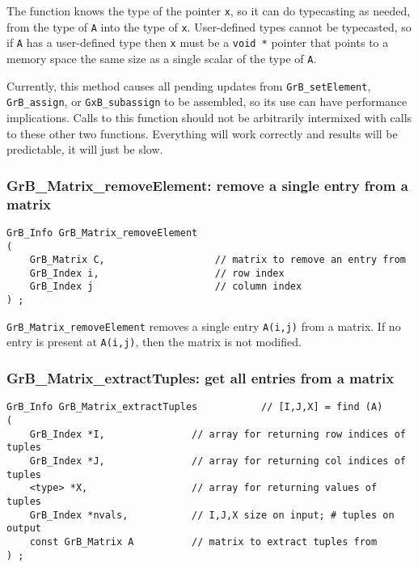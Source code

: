 \documentclass[12pt]{article}
\begin{document}
The function knows the type of the pointer \verb'x', so it can do typecasting
as needed, from the type of \verb'A' into the type of \verb'x'.  User-defined
types cannot be typecasted, so if \verb'A' has a user-defined type then
\verb'x' must be a \verb'void *' pointer that points to a memory space the same
size as a single scalar of the type of \verb'A'.

Currently, this method causes all pending updates from
\verb'GrB_setElement', \verb'GrB_assign', or \verb'GxB_subassign' to be
assembled, so its use can have performance implications.  Calls to this
function should not be arbitrarily intermixed with calls to these other two
functions.  Everything will work correctly and results will be predictable, it
will just be slow.

\subsubsection{{\sf GrB\_Matrix\_removeElement:} remove a single entry from a matrix}
\label{matrix_removeElement}

\begin{mdframed}[userdefinedwidth=6in]
{\footnotesize
\begin{verbatim}
GrB_Info GrB_Matrix_removeElement
(
    GrB_Matrix C,                   // matrix to remove an entry from
    GrB_Index i,                    // row index
    GrB_Index j                     // column index
) ;
\end{verbatim} } \end{mdframed}

\verb'GrB_Matrix_removeElement' removes a single entry \verb'A(i,j)' from a matrix.
If no entry is present at \verb'A(i,j)', then the matrix is not modified.

\subsubsection{{\sf GrB\_Matrix\_extractTuples:} get all entries from a matrix}
\label{matrix_extractTuples}

\begin{mdframed}[userdefinedwidth=6in]
{\footnotesize
\begin{verbatim}
GrB_Info GrB_Matrix_extractTuples           // [I,J,X] = find (A)
(
    GrB_Index *I,               // array for returning row indices of tuples
    GrB_Index *J,               // array for returning col indices of tuples
    <type> *X,                  // array for returning values of tuples
    GrB_Index *nvals,           // I,J,X size on input; # tuples on output
    const GrB_Matrix A          // matrix to extract tuples from
) ;
\end{verbatim} } \end{mdframed}
\end{document}
